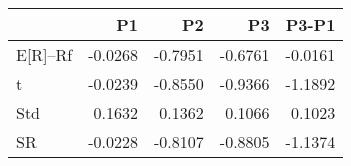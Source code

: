 \begin{tabular}{lrrrr}
\toprule
 & P1 & P2 & P3 & P3-P1 \\
\midrule
E[R]--Rf & -0.0268 & -0.7951 & -0.6761 & -0.0161 \\
t & -0.0239 & -0.8550 & -0.9366 & -1.1892 \\
Std & 0.1632 & 0.1362 & 0.1066 & 0.1023 \\
SR & -0.0228 & -0.8107 & -0.8805 & -1.1374 \\
\bottomrule
\end{tabular}
